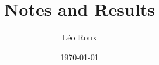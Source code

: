 \documentclass[a4paper,11pt]{article}
\title{Notes and Results}
\author{Léo Roux}
\date{\today}
\begin{document}
    \maketitle

    


    \printbibliography\
\end{document}
